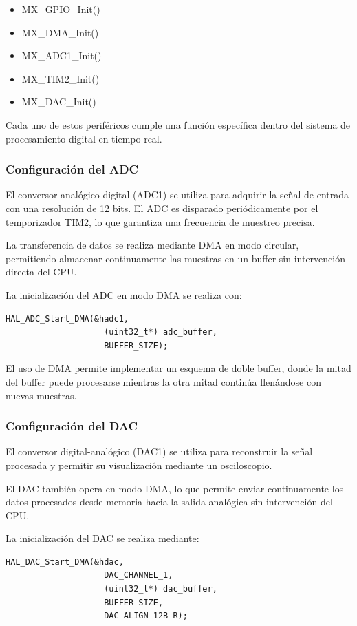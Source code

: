 \documentclass[12pt]{article}
\begin{document}
	\begin{itemize}
	\item MX\_GPIO\_Init()
	\item MX\_DMA\_Init()
	\item MX\_ADC1\_Init()
	\item MX\_TIM2\_Init()
	\item MX\_DAC\_Init()
	\end{itemize}

	Cada uno de estos periféricos cumple una función específica dentro del sistema de procesamiento digital en tiempo real.

	\subsubsection{Configuración del ADC}
	El conversor analógico-digital (ADC1) se utiliza para adquirir la señal de entrada con una resolución de 12 bits. El ADC es disparado periódicamente por el temporizador TIM2, lo que garantiza una frecuencia de muestreo precisa.

	La transferencia de datos se realiza mediante DMA en modo circular, permitiendo almacenar continuamente las muestras en un buffer sin intervención directa del CPU.

	La inicialización del ADC en modo DMA se realiza con:

	\begin{lstlisting}[style=mystyle]
	HAL_ADC_Start_DMA(&hadc1,
					(uint32_t*) adc_buffer,
					BUFFER_SIZE);
	\end{lstlisting}

	El uso de DMA permite implementar un esquema de doble buffer, donde la mitad del buffer puede procesarse mientras la otra mitad continúa llenándose con nuevas muestras.

	\subsubsection{Configuración del DAC}
	El conversor digital-analógico (DAC1) se utiliza para reconstruir la señal procesada y permitir su visualización mediante un osciloscopio.

	El DAC también opera en modo DMA, lo que permite enviar continuamente los datos procesados desde memoria hacia la salida analógica sin intervención del CPU.

	La inicialización del DAC se realiza mediante:

	\begin{lstlisting}[style=mystyle]
	HAL_DAC_Start_DMA(&hdac,
					DAC_CHANNEL_1,
					(uint32_t*) dac_buffer,
					BUFFER_SIZE,
					DAC_ALIGN_12B_R);
	\end{lstlisting}
\end{document}
